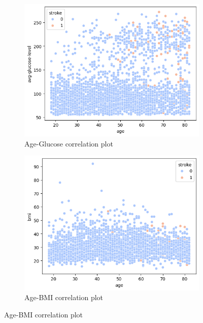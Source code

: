 \documentclass{Configuration_Files/Template}
\begin{document}
\begin{figure}[ht]
\begin{subfigure}[b]{\linewidth}
\centering
\includegraphics[scale=0.4]{Images/age_glucose_plot.png}
\caption{Age-Glucose correlation plot}
\label{fig:age_glucose}
\end{subfigure}

\begin{subfigure}[b]{\linewidth}
\centering
\includegraphics[scale=0.4]{Images/age_bmi_plot.png}
\caption{Age-BMI correlation plot}
\label{fig:age_bmi}
\end{subfigure}


\end{figure}
\end{document}

